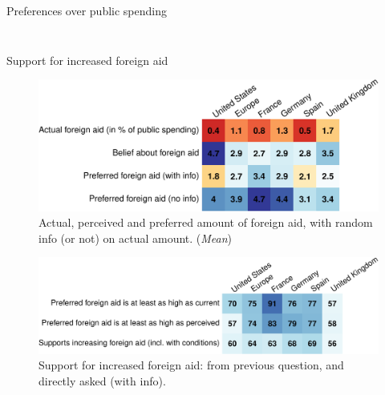 \documentclass[aspectratio=169,xcolor=dvipsnames, 11pt,mathserif]{beamer}
\begin{document}
\begin{framefont}{\small}
\begin{frame}{Preferences over public spending%
	\hyperlink{other_policies}{}}
\begin{columns}
\begin{column}{0.5\textwidth}
\begin{figure}
            \end{figure}
        \end{column}
    \end{columns}
	\bbvs \ip {}
	\ee 
\end{frame} 

\begin{frame}{Support for increased foreign aid \hyperlink{other_policies}{}\label{foreign_aid_perceptions}}\vspace{-.2cm} 
    \begin{figure} 
        \centering 
        \caption{Actual, perceived and preferred amount of foreign aid, with random info (or not) on actual amount. (\textit{Mean})}\vspace{-.2cm}
        \includegraphics[height=.4\textheight]{../figures/country_comparison/foreign_aid_amount_mean.pdf} %
    \end{figure}\vspace{-.2cm}\pause
    \begin{figure} 
        \centering 
        \caption{Support for increased foreign aid: from previous question, and directly asked (with info).}\vspace{-.2cm}
        \includegraphics[height=.32\textheight]{../figures/country_comparison/foreign_aid_no_less_positive.pdf} 
    \end{figure} \vspace{-.1cm}
	\quad \quad \quad \quad \quad \quad {} \quad \quad \quad {}
\end{frame}


\end{framefont}
\end{document}
